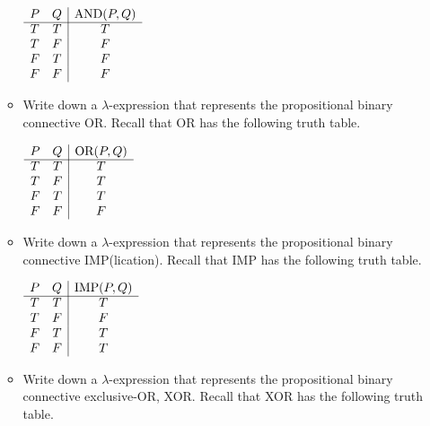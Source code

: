 \documentclass[11pt]{report}
\begin{document}
\begin{enumerate}
\begin{itemize}
				$\begin{array}{ c c | c }			
					P & Q & \text{AND}(P,Q)\\
					\cline{1 - 3}
					T & T & T \\ 
					T & F & F \\ 
					F & T & F \\ 
					F & F & F
				\end{array}$
		
			\vspace{0.5cm}
			\item Write down a $\lambda$-expression that represents the propositional binary connective OR. Recall that OR has the following truth table.
			
			\vspace{0.5cm}
	
				$\begin{array}{ c c | c }			
					P & Q & \text{OR}(P,Q)\\
					\cline{1 - 3}
					T & T & T \\ 
					T & F & T \\ 
					F & T & T \\ 
					F & F & F
				\end{array}$

			\vspace{0.5cm}
			\item Write down a $\lambda$-expression that represents the propositional binary connective IMP(lication). Recall that IMP has the following truth table.
			
			\vspace{0.5cm}
	
				$\begin{array}{ c c | c }			
					P & Q & \text{IMP}(P,Q)\\
					\cline{1 - 3}
					T & T & T \\ 
					T & F & F \\ 
					F & T & T \\ 
					F & F & T
				\end{array}$				
			\vspace{0.5cm}
			\item Write down a $\lambda$-expression that represents the propositional binary connective exclusive-OR, XOR. Recall that XOR has the following truth table.
			
			\vspace{0.5cm}
	

\end{itemize}
\end{enumerate}
\end{document}
